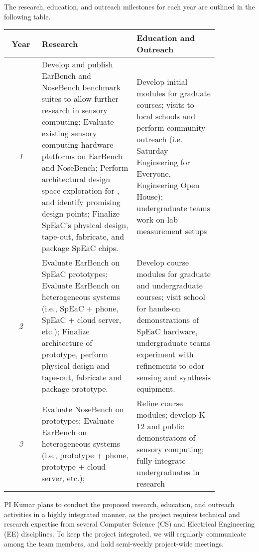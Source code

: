 The research, education, and outreach milestones for each year are outlined in
the following table.
\begin{tabular}{||c|p{0.45\linewidth}|p{0.39\linewidth}||}
\hline
\hline
\textbf{Year} & \textbf{Research} & \textbf{Education and Outreach}\\
\hline
\textit{1} &
Develop and publish EarBench and NoseBench benchmark suites to allow further
research in sensory computing;
Evaluate existing sensory computing hardware platforms on EarBench and NoseBench;
Perform architectural design space exploration for \olfc{}, and identify
promising design points;
Finalize SpEaC's physical design, tape-out, fabricate, and package SpEaC chips.
&
Develop initial modules for graduate courses; visits to local schools and
perform community outreach (i.e. Saturday Engineering for Everyone, Engineering
Open House); undergraduate teams work on lab measurement setups \\
\hline
\textit{2} &
Evaluate EarBench on SpEaC prototypes;
Evaluate EarBench on heterogeneous systems (i.e., SpEaC + phone, SpEaC + cloud
server, etc.);
Finalize architecture of \olfc{} prototype, perform physical design and tape-out,
fabricate and package \olfc{} prototype.
&
Develop course modules for graduate and undergraduate courses;
visit school for hands-on demonstrations of SpEaC hardware,
undergraduate teams experiment with refinements to odor sensing and synthesis
equipment.
\\
\hline
\textit{3}  &
Evaluate NoseBench on \olfc{} prototypes;
Evaluate EarBench on heterogeneous systems (i.e., prototype + phone, prototype
+ cloud server, etc.);
 &
Refine course modules; develop K-12 and public demonstrators of sensory
computing; fully integrate undergraduates in research\\
\hline
\hline
\end{tabular}
 
PI Kumar plans to conduct the proposed research, education, and outreach
activities in a highly integrated manner, as the project requires technical and
research expertise from several Computer Science (CS) and Electrical
Engineering (EE) disciplines. To keep the project integrated, we will regularly
communicate among the team members, and hold semi-weekly project-wide meetings.

